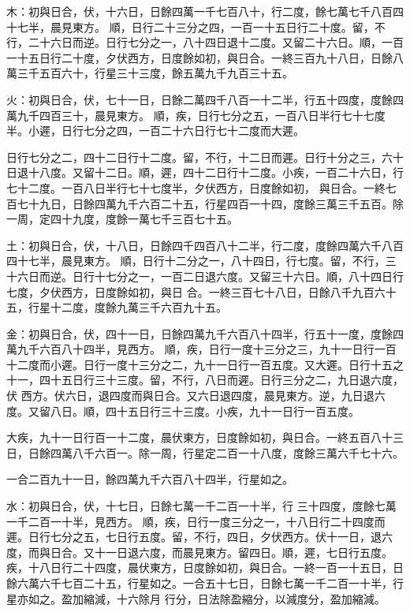 \begin{pinyinscope}
木：初與日合，伏，十六日，日餘四萬一千七百八十，行二度，餘七萬七千八百四十七半，晨見東方。
 順，日行二十三分之四，一百一十五日行二十度。留，不行，二十六日而逆。日行七分之一，八十四日退十二度。又留二十六日。順，一百一十五日行二十度，夕伏西方，日度餘如初，與日合。一終三百九十八日，日餘八萬三千五百六十，行星三十三度，餘五萬九千九百三十五。


火：初與日合，伏，七十一日，日餘二萬四千八百一十二半，行五十四度，度餘四萬九千四百三十，晨見東方。
 順，疾，日行七分之五，一百八日半行七十七度半。小遲，日行七分之四，一百二十六日行七十二度而大遲。



 日行七分之二，四十二日行十二度。留，不行，十二日而遲。日行十分之三，六十日退十八度。又留十二日。順，遲，四十二日行十二度。小疾，一百二十六日，行七十二度。一百八日半行七十七度半，夕伏西方，日度餘如初，
 與日合。一終七百七十九日，日餘四萬九千六百二十五，行星四百一十四，度餘三萬三千五百。除一周，定四十九度，度餘一萬七千三百七十五。


土：初與日合，伏，十八日，日餘四千四百八十二半，行二度，度餘四萬六千八百四十七半，晨見東方。
 順，日行十二分之一，八十四日，行七度。留，不行，三十六日而逆。日行十七分之一，一百二日退六度。又留三十六日。順，八十四日行七度，夕伏西方，日度餘如初，與日
 合。一終三百七十八日，日餘八千九百六十五，行星十二度，度餘九萬三千六百九十五。


金：初與日合，伏，四十一日，日餘四萬九千六百八十四半，行五十一度，度餘四萬九千六百八十四半，見西方。
 順，疾，日行一度十三分之三，九十一日行一百十二度而小遲。日行一度十三分之二，九十一日行一百五度。又大遲。日行十五之十一，四十五日行三十三度。留，不行，八日而遲。日行三分之二，九日退六度，伏
 西方。伏六日，退四度而與日合。又六日退四度，晨見東方。逆，九日退六度。又留八日。順，四十五日行三十三度。小疾，九十一日行一百五度。



 大疾，九十一日行百一十二度，晨伏東方，日度餘如初，與日合。一終五百八十三日，日餘四萬八千六百一。除一周，行星定二百一十八度，度餘三萬六千七十六。



 一合二百九十一日，餘四萬九千六百八十四半，行星如之。


水：初與日合，伏，十七日，日餘七萬一千二百一十半，行
 三十四度，度餘七萬一千二百一十半，見西方。
 順，疾，日行一度三分之一，十八日行二十四度而遲。日行七分之五，七日行五度。留，不行，四日，夕伏西方。伏十一日，退六度，而與日合。又十一日退六度，而晨見東方。留四日。順，遲，七日行五度。疾，十八日行二十四度，晨伏東方，日度餘如初，與日合。一終一百一十五日，日餘六萬六千七百二十五，行星如之。一合五十七日，日餘七萬一千二百一十半，行星亦如之。盈加縮減，十六除月
 行分，日法除盈縮分，以減度分，盈加縮減。




\end{pinyinscope}
